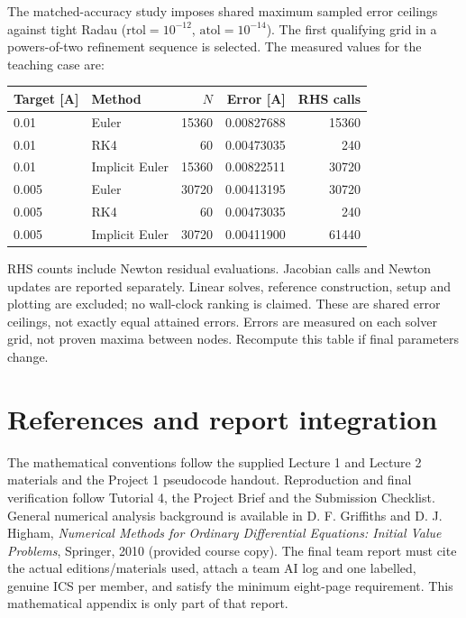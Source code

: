\documentclass[11pt]{article}
\begin{document}
The matched-accuracy study imposes shared maximum sampled error ceilings against
tight Radau ($\mathrm{rtol}=10^{-12}$, $\mathrm{atol}=10^{-14}$).
The first qualifying grid in a powers-of-two refinement sequence is selected.
The measured values for the teaching case are:
\begin{center}
\begin{tabular}{llrrr}\toprule
Target [A]&Method&$N$&Error [A]&RHS calls\\\midrule
0.01&Euler&15360&0.00827688&15360\\
0.01&RK4&60&0.00473035&240\\
0.01&Implicit Euler&15360&0.00822511&30720\\
0.005&Euler&30720&0.00413195&30720\\
0.005&RK4&60&0.00473035&240\\
0.005&Implicit Euler&30720&0.00411900&61440\\\bottomrule
\end{tabular}
\end{center}
RHS counts include Newton residual evaluations. Jacobian calls and Newton updates
are reported separately. Linear solves, reference construction, setup and plotting
are excluded; no wall-clock ranking is claimed. These are shared error ceilings,
not exactly equal attained errors. Errors are measured on each solver grid,
not proven maxima between nodes. Recompute this table if final parameters change.

\section{References and report integration}
The mathematical conventions follow the supplied Lecture 1 and Lecture 2 materials
and the Project 1 pseudocode handout. Reproduction and final verification follow
Tutorial 4, the Project Brief and the Submission Checklist. General numerical
analysis background is available in D. F. Griffiths and D. J. Higham,
\emph{Numerical Methods for Ordinary Differential Equations: Initial Value Problems},
Springer, 2010 (provided course copy).
The final team report must cite the actual editions/materials used, attach a team
AI log and one labelled, genuine ICS per member, and satisfy the minimum eight-page
requirement. This mathematical appendix is only part of that report.

\newpage
\end{document}
